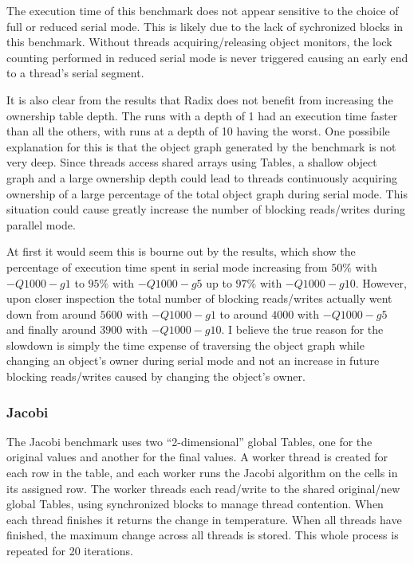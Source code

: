 The execution time of this benchmark does not appear sensitive to the
choice of full or reduced serial mode.  This is likely due to the lack
of sychronized blocks in this benchmark.  Without threads
acquiring/releasing object monitors, the lock counting performed in
reduced serial mode is never triggered causing an early end to a
thread's serial segment.

It is also clear from the results that Radix does not benefit from
increasing the ownership table depth.  The runs with a depth of 1 had
an execution time faster than all the others, with runs at a depth of
10 having the worst.  One possibile explanation for this is that the
object graph generated by the benchmark is not very deep.  Since
threads access shared arrays using Tables, a shallow object graph and
a large ownership depth could lead to threads continuously acquiring
ownership of a large percentage of the total object graph during
serial mode.  This situation could cause greatly increase the number
of blocking reads/writes during parallel mode.

At first it would seem this is bourne out by the results, which show
the percentage of execution time spent in serial mode increasing from
$50\%$ with $-Q1000 -g1$ to $95\%$ with $-Q1000 -g5$ up to $97\%$ with
$-Q1000 -g10$.  However, upon closer inspection the total number of
blocking reads/writes actually went down from around $5600$ with
$-Q1000 -g1$ to around $4000$ with $-Q1000 -g5$ and finally around
$3900$ with $-Q1000 -g10$.  I believe the true reason for the slowdown
is simply the time expense of traversing the object graph while
changing an object's owner during serial mode and not an increase in
future blocking reads/writes caused by changing the object's owner.

\subsubsection{Jacobi}

The Jacobi benchmark uses two ``2-dimensional'' global Tables, one for
the original values and another for the final values.  A worker thread
is created for each row in the table, and each worker runs the Jacobi
algorithm on the cells in its assigned row.  The worker threads each
read/write to the shared original/new global Tables, using
synchronized blocks to manage thread contention.  When each thread
finishes it returns the change in temperature.  When all threads have
finished, the maximum change across all threads is stored.  This whole
process is repeated for 20 iterations.

